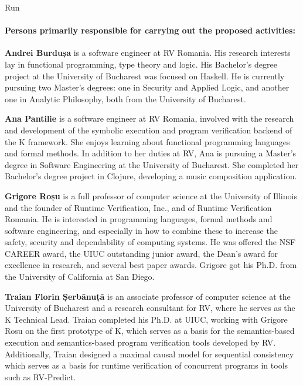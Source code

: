\begin{sitedescription}{Run}
\paragraph*{Persons primarily responsible for carrying out the proposed activities:}

\begin{compactitem} %

\item{\bf Andrei Burdușa} is a software engineer at RV Romania.
His research interests lay in functional programming, type theory and logic.
His Bachelor's degree project at the University of Bucharest was focused on Haskell.
He is currently pursuing two Master’s degrees: one in Security and Applied Logic,
and another one in Analytic Philosophy, both from the University of Bucharest.

\item{\bf Ana Pantilie} is a software engineer at RV Romania, involved with the
research and development of the symbolic execution and program verification
backend of the K framework.
She enjoys learning about functional programming languages and formal methods.
In addition to her duties at RV, Ana is pursuing a Master's degree in Software
Engineering at the University of Bucharest.
She completed her Bachelor's degree project in Clojure, developing a music
composition application.

\item{\bf Grigore Roșu} is a full professor of computer science at the
University of Illinois and the founder of Runtime Verification, Inc., and of 
Runtime Verification Romania. He is interested in programming languages,
formal methods and software engineering, and especially in how to combine
these to increase the safety, security and dependability of computing systems.
He was offered the NSF CAREER award, the UIUC outstanding junior award,
the Dean's award for excellence in research, and several best paper awards.
Grigore got his Ph.D. from the University of California at San Diego.

\item{\bf Traian Florin Șerbănuță} is an associate professor of computer science
at the University of Bucharest and a research consultant for RV, where he serves
as the K Technical Lead.
Traian completed his Ph.D. at UIUC, working with Grigore Rosu
on the first prototype of K, which serves as a basis for the semantics-based execution
and semantics-based program verification tools developed by RV.
Additionally, Traian designed a maximal causal model for sequential consistency
which serves as a basis for runtime verification of concurrent programs in tools
such as RV-Predict.

\end{compactitem}

\end{sitedescription}

